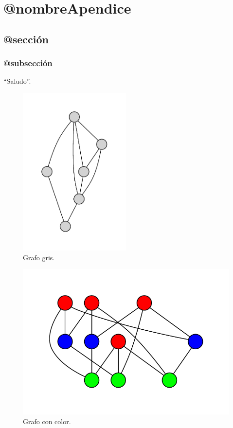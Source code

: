 \chapter{@nombreApendice}
\label{apendiceA}


\section{@sección}
\blindtext

\subsection{@subsección}
\Blindtext

``Saludo''.

\begin{figure}[h!]
\centering
\includegraphics[width=0.5\textwidth]{../img/grafo}
\caption[Grafo]{Grafo gris.}
\label{imagen:grafo}
\end{figure}

\begin{figure}[h!]
\centering
\includegraphics[width=\textwidth]{../img/grafocolor}
\caption[Grafo coloreado (esto sale en la tabla de contenidos)]{Grafo con color.}
\label{imagen:grafodecolores}
\end{figure}
